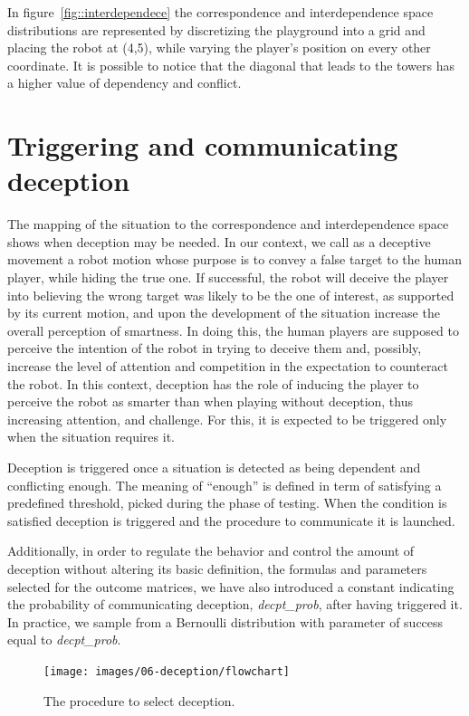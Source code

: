 In figure~\ref{fig::interdependece} the correspondence and interdependence space distributions are represented by discretizing the playground into a grid and placing the robot at (4,5), while varying the  player's position on every other coordinate. It is possible to notice that the diagonal that leads to the towers has a higher value of dependency and conflict.

\section{Triggering and communicating deception}\label{sec:deception_communicating}
The mapping of the situation to the correspondence and interdependence space shows when deception may be needed. In our context, we call as a deceptive movement a robot motion whose purpose is to convey a false target to the human player, while hiding the true one. If successful, the robot will deceive the player into believing the wrong target was likely to be the one of interest, as supported by its current motion, and upon the development of the situation increase the overall perception of smartness. In doing this, the human players are supposed to perceive the intention of the robot in trying to deceive them and, possibly, increase the level of attention and competition in the expectation to counteract the robot. In this context, deception has the role of inducing the player to perceive the robot as smarter than when playing without deception, thus increasing attention, and challenge. For this, it is expected to be triggered only when the situation requires it. 

Deception is triggered once a situation is detected as being dependent and conflicting enough. The meaning of ``enough'' is defined in term of satisfying a predefined threshold, picked during the phase of testing. When the condition is satisfied deception is triggered and the procedure to communicate it is launched.

Additionally, in order to regulate the behavior and control the amount of deception without altering its basic definition, \ie the formulas and parameters selected for the outcome matrices, we have also introduced a constant indicating the probability of communicating deception, \textit{decpt\_prob},  after having triggered it. In practice, we sample from a Bernoulli distribution with parameter of success equal to \textit{decpt\_prob}. 

\begin{figure}[h]
    \centering
    \texttt{[image: images/06-deception/flowchart]}
    \caption{The procedure to select deception.}
    \label{fig:flowchart}
\end{figure}

